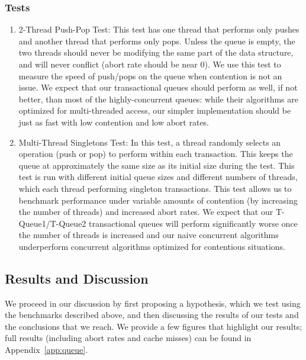 \subsubsection{Tests}
\begin{enumerate}
\item 2-Thread Push-Pop Test: This test has one thread that performs only pushes and another thread that performs only pops. Unless the queue is empty, the two threads should never be modifying the same part of the data structure, and will never conflict (abort rate should be near 0). We use this test to measure the speed of push/pops on the queue when contention is not an issue. We expect that our transactional queues should perform as well, if not better, than most of the highly-concurrent queues: while their algorithms are optimized for multi-threaded access, our simpler implementation should be just as fast with low contention and low abort rates.

\item Multi-Thread Singletons Test: 
    In this test, a thread randomly selects an operation (push or pop) to perform within each transaction. This keeps the queue at approximately the same size as its initial size during the test. This test is run with different initial queue sizes and different numbers of threads, which each thread performing singleton transactions. This test allows us to benchmark performance under variable amounts of contention (by increasing the number of threads) and increased abort rates. We expect that our T-Queue1/T-Queue2 transactional queues will perform significantly worse once the number of threads is increased and our naive concurrent algorithms underperform concurrent algorithms optimized for contentious situations.
\end{enumerate}

\subsection{Results and Discussion}

We proceed in our discussion by first proposing a hypothesis, which we test using the benchmarks described above, and then discussing the results of our tests and the conclusions that we reach.
We provide a few figures that highlight our results; full results (including abort rates and cache misses) can be found in Appendix~\ref{app:queue}. 


